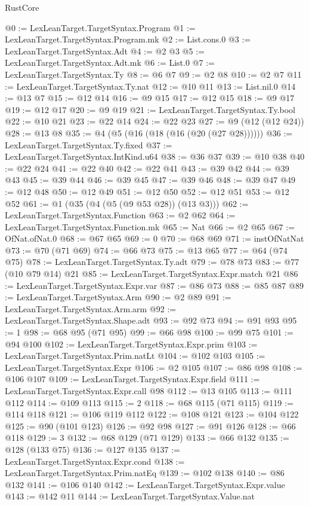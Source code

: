 \begin{lexlean}{RustCore}
\begin{coremodule}
@0 := LexLeanTarget.TargetSyntax.Program
@1 := LexLeanTarget.TargetSyntax.Program.mk
@2 := List.cons.{0}
@3 := LexLeanTarget.TargetSyntax.Adt
@4 := @2 @3
@5 := LexLeanTarget.TargetSyntax.Adt.mk
@6 := List.{0}
@7 := LexLeanTarget.TargetSyntax.Ty
@8 := @6 @7
@9 := @2 @8
@10 := @2 @7
@11 := LexLeanTarget.TargetSyntax.Ty.nat
@12 := @10 @11
@13 := List.nil.{0}
@14 := @13 @7
@15 := @12 @14
@16 := @9 @15
@17 := @12 @15
@18 := @9 @17
@19 := @12 @17
@20 := @9 @19
@21 := LexLeanTarget.TargetSyntax.Ty.bool
@22 := @10 @21
@23 := @22 @14
@24 := @22 @23
@27 := @9 (@12 (@12 @24))
@28 := @13 @8
@35 := @4 (@5 (@16 (@18 (@16 (@20 (@27 @28))))))
@36 := LexLeanTarget.TargetSyntax.Ty.fixed
@37 := LexLeanTarget.TargetSyntax.IntKind.u64
@38 := @36 @37
@39 := @10 @38
@40 := @22 @24
@41 := @22 @40
@42 := @22 @41
@43 := @39 @42
@44 := @39 @43
@45 := @39 @44
@46 := @39 @45
@47 := @39 @46
@48 := @39 @47
@49 := @12 @48
@50 := @12 @49
@51 := @12 @50
@52 := @12 @51
@53 := @12 @52
@61 := @1 (@35 (@4 (@5 (@9 @53 @28)) (@13 @3)))
@62 := LexLeanTarget.TargetSyntax.Function
@63 := @2 @62
@64 := LexLeanTarget.TargetSyntax.Function.mk
@65 := Nat
@66 := @2 @65
@67 := OfNat.ofNat.{0}
@68 := @67 @65
@69 := 0
@70 := @68 @69
@71 := instOfNatNat
@73 := @70 (@71 @69)
@74 := @66 @73
@75 := @13 @65
@77 := @64 (@74 @75)
@78 := LexLeanTarget.TargetSyntax.Ty.adt
@79 := @78 @73
@83 := @77 (@10 @79 @14) @21
@85 := LexLeanTarget.TargetSyntax.Expr.match @21
@86 := LexLeanTarget.TargetSyntax.Expr.var
@87 := @86 @73
@88 := @85 @87
@89 := LexLeanTarget.TargetSyntax.Arm
@90 := @2 @89
@91 := LexLeanTarget.TargetSyntax.Arm.arm
@92 := LexLeanTarget.TargetSyntax.Shape.adt
@93 := @92 @73
@94 := @91 @93
@95 := 1
@98 := @68 @95 (@71 @95)
@99 := @66 @98
@100 := @99 @75
@101 := @94 @100
@102 := LexLeanTarget.TargetSyntax.Expr.prim
@103 := LexLeanTarget.TargetSyntax.Prim.natLt
@104 := @102 @103
@105 := LexLeanTarget.TargetSyntax.Expr
@106 := @2 @105
@107 := @86 @98
@108 := @106 @107
@109 := LexLeanTarget.TargetSyntax.Expr.field
@111 := LexLeanTarget.TargetSyntax.Expr.call @98
@112 := @13 @105
@113 := @111 @112
@114 := @109 @113
@115 := 2
@118 := @68 @115 (@71 @115)
@119 := @114 @118
@121 := @106 @119 @112
@122 := @108 @121
@123 := @104 @122
@125 := @90 (@101 @123)
@126 := @92 @98
@127 := @91 @126
@128 := @66 @118
@129 := 3
@132 := @68 @129 (@71 @129)
@133 := @66 @132
@135 := @128 (@133 @75)
@136 := @127 @135
@137 := LexLeanTarget.TargetSyntax.Expr.cond
@138 := LexLeanTarget.TargetSyntax.Prim.natEq
@139 := @102 @138
@140 := @86 @132
@141 := @106 @140
@142 := LexLeanTarget.TargetSyntax.Expr.value
@143 := @142 @11
@144 := LexLeanTarget.TargetSyntax.Value.nat

\end{coremodule}
\end{lexlean}
